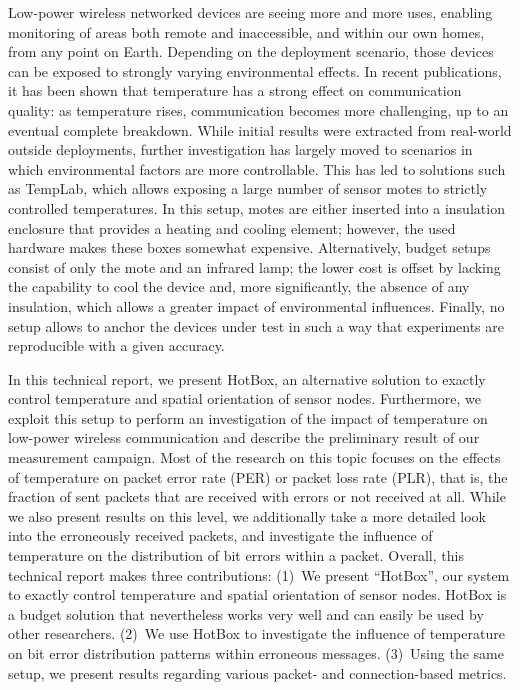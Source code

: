 \documentclass[color]{aib}
\begin{document}
Low-power wireless networked devices are seeing more and more uses, enabling monitoring of areas both remote and inaccessible, and within our own homes, from any point on Earth.
Depending on the deployment scenario, those devices can be exposed to strongly varying environmental effects.
In recent publications, it has been shown that temperature has a strong effect on communication quality\cite{bannister08hot,boano10transaction,boano13extreme,wennerstrom13extreme,boano14templab}: as temperature rises, communication becomes more challenging, up to an eventual complete breakdown.
While initial results were extracted from real-world outside deployments, further investigation has largely moved to scenarios in which environmental factors are more controllable.
This has led to solutions such as TempLab\cite{boano14templab}, which allows exposing a large number of sensor motes to strictly controlled temperatures.
In this setup, motes are either inserted into a insulation enclosure that provides a heating and cooling element; however, the used hardware makes these boxes somewhat expensive.
Alternatively, budget setups consist of only the mote and an infrared lamp; the lower cost is offset by lacking the capability to cool the device and, more significantly, the absence of any insulation, which allows a greater impact of environmental influences.
Finally, no setup allows to anchor the devices under test in such a way that experiments are reproducible with a given accuracy.

In this technical report, we present HotBox, an alternative solution to exactly control temperature and spatial orientation of sensor nodes.
Furthermore, we exploit this setup to perform an investigation of the impact of temperature on low-power wireless communication and describe the preliminary result of our measurement campaign.
Most of the research on this topic focuses on the effects of temperature on packet error rate (PER) or packet loss rate (PLR), that is, the fraction of sent packets that are received with errors or not received at all.
While we also present results on this level, we additionally take a more detailed look into the erroneously received packets, and investigate the influence of temperature on the distribution of bit errors within a packet.
Overall, this technical report makes three contributions:
(1)~We present ``HotBox'', our system to exactly control temperature and spatial orientation of sensor nodes. HotBox is a budget solution that nevertheless works very well and can easily be used by other researchers.
(2)~We use HotBox to investigate the influence of temperature on bit error distribution patterns within erroneous messages.
(3)~Using the same setup, we present results regarding various packet- and connection-based metrics.
\end{document}
